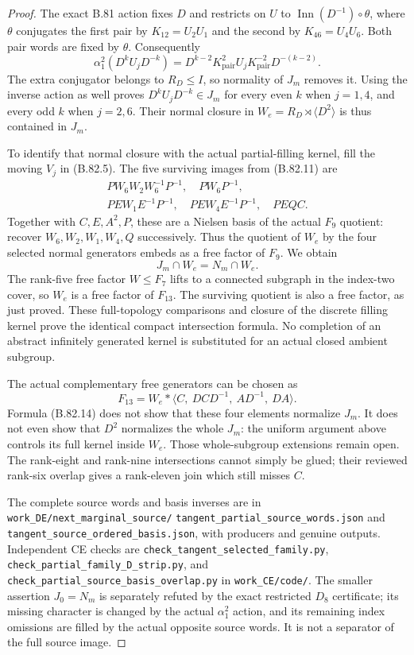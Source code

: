 \begin{proof}
The exact B.81 action fixes \(D\) and restricts on \(U\) to
\(\operatorname{Inn}(D^{-1})\circ\theta\), where \(\theta\)
conjugates the first pair by \(K_{12}=U_2U_1\) and the second by
\(K_{46}=U_4U_6\). Both pair words are fixed by \(\theta\).
Consequently
\[
 \alpha_1^2(D^kU_jD^{-k})
   =D^{k-2}K_{\mathrm{pair}}^2U_jK_{\mathrm{pair}}^{-2}D^{-(k-2)}.
 \tag{B.82.12}
\]
The extra conjugator belongs to \(R_D\le I\), so normality of
\(J_m\) removes it. Using the inverse action as well proves
\(D^kU_jD^{-k}\in J_m\) for every even \(k\) when \(j=1,4\),
and every odd \(k\) when \(j=2,6\). Their normal closure in
\(W_e=R_D\rtimes\langle D^2\rangle\) is thus contained in
\(J_m\).

To identify that normal closure with the actual partial-filling kernel,
fill the moving \(V_j\) in (B.82.5). The five surviving images from
(B.82.11) are
\[
 \begin{gathered}
 PW_6W_2W_6^{-1}P^{-1},\quad PW_6P^{-1},\\
 PEW_1E^{-1}P^{-1},\quad PEW_4E^{-1}P^{-1},\quad PEQC.
 \end{gathered}
 \tag{B.82.13}
\]
Together with \(C,E,A^2,P\), these are a Nielsen basis of the actual
\(F_9\) quotient: recover \(W_6,W_2,W_1,W_4,Q\) successively.
Thus the quotient of \(W_e\) by the four selected normal generators
embeds as a free factor of \(F_9\). We obtain
\[
                       J_m\cap W_e=N_m\cap W_e.
 \tag{B.82.14}
\]
The rank-five free factor \(W\le F_7\) lifts to a connected subgraph
in the index-two cover, so \(W_e\) is a free factor of \(F_{13}\).
The surviving quotient is also a free factor, as just proved. These
full-topology comparisons and closure of the discrete filling kernel
prove the identical compact intersection formula. No completion of an
abstract infinitely generated kernel is substituted for an actual
closed ambient subgroup.

The actual complementary free generators can be chosen as
\[
        F_{13}=W_e*\langle C,\ DCD^{-1},\ AD^{-1},\ DA\rangle.
 \tag{B.82.15}
\]
Formula (B.82.14) does not show that these four elements normalize
\(J_m\). It does not even show that \(D^2\) normalizes the whole
\(J_m\): the uniform argument above controls its full kernel inside
\(W_e\). Those whole-subgroup extensions remain open. The rank-eight
and rank-nine intersections cannot simply be glued; their reviewed
rank-six overlap gives a rank-eleven join which still misses \(C\).

The complete source words and basis inverses are in
\texttt{work\_DE/next\_marginal\_source/}\allowbreak
\texttt{tangent\_partial\_source\_words.json} and
\texttt{tangent\_source\_ordered\_basis.json}, with producers and
genuine outputs. Independent CE checks are
\texttt{check\_tangent\_selected\_family.py},
\texttt{check\_partial\_family\_D\_strip.py}, and
\texttt{check\_partial\_source\_basis\_overlap.py} in
\texttt{work\_CE/code/}. The smaller assertion \(J_0=N_m\) is
separately refuted by the exact restricted \(D_8\) certificate; its
missing character is changed by the actual \(\alpha_1^2\) action,
and its remaining index omissions are filled by the actual opposite
source words. It is not a separator of the full source image.
\end{proof}
